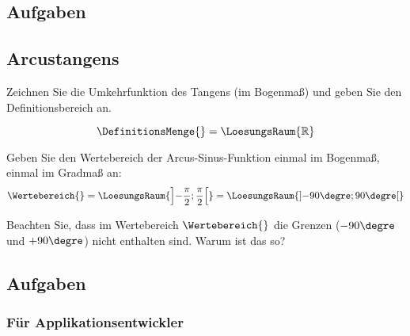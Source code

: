\subsection*{Aufgaben}
\TNTeop{}


\subsection{Arcustangens}
Zeichnen Sie die Umkehrfunktion des Tangens (im Bogenmaß) und geben Sie den Definitionsbereich an.



$$\DefinitionsMenge{} = \LoesungsRaum{\mathbb{R}}$$

Geben Sie den Wertebereich der Arcus-Sinus-Funktion einmal im Bogenmaß,
einmal im Gradmaß an:
$$\Wertebereich{} = \LoesungsRaum{\left]-\frac{\pi}{2}; \frac{\pi}{2}\right[}  = \LoesungsRaum{\left]-90\degre; 90\degre\right[}$$

Beachten Sie, dass im Wertebereich $\Wertebereich{}$ die Grenzen ($-90\degre$und $+90\degre$) nicht enthalten sind. Warum ist das so?

\subsection*{Aufgaben}
\TNTeop{}


\subsubsection{Für Applikationsentwickler}

